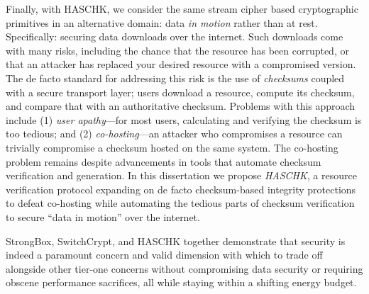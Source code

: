 Finally, with HASCHK, we consider the same stream cipher based cryptographic
primitives in an alternative domain: data \emph{in motion} rather than at rest.
Specifically: securing data downloads over the internet. Such downloads come
with many risks, including the chance that the resource has been corrupted, or
that an attacker has replaced your desired resource with a compromised version.
The de facto standard for addressing this risk is the use of \emph{checksums}
coupled with a secure transport layer; users download a resource, compute its
checksum, and compare that with an authoritative checksum. Problems with this
approach include (1) \emph{user apathy}---for most users, calculating and
verifying the checksum is too tedious; and (2) \emph{co-hosting}---an attacker
who compromises a resource can trivially compromise a checksum hosted on the
same system. The co-hosting problem remains despite advancements in tools that
automate checksum verification and generation. In this dissertation we propose
\emph{HASCHK}, a resource verification protocol expanding on de facto
checksum-based integrity protections to defeat co-hosting while automating the
tedious parts of checksum verification to secure ``data in motion'' over the
internet.

StrongBox, SwitchCrypt, and HASCHK together demonstrate that security is indeed
a paramount concern and valid dimension with which to trade off alongside other
tier-one concerns without compromising data security or requiring obscene
performance sacrifices, all while staying within a shifting energy budget.
